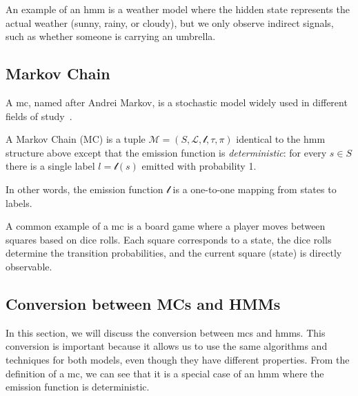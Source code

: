 An example of an \gls{hmm} is a weather model where the hidden state represents the actual weather (sunny, rainy, or cloudy), but we only observe indirect signals, such as whether someone is carrying an umbrella.

\subsection{Markov Chain}\label{subsec:mc}
A \gls{mc}, named after Andrei Markov, is a stochastic model widely used in different fields of study~\cite{Rabiner89}.
\begin{definition}
    A Markov Chain (MC) is a tuple $\mathcal{M} = (S, \mathcal{L}, \mathscr{l}, \tau,  \pi)$ identical to the \gls{hmm} structure above except that the emission function is
    \emph{deterministic}: for every $s\in S$ there is a single label
    $l=\mathscr{l}(s)$ emitted with probability 1.
\end{definition}
In other words, the emission function $\mathscr{l}$ is a one-to-one mapping from states to labels.

A common example of a \gls{mc} is a board game where a player moves between squares based on dice rolls.
Each square corresponds to a state, the dice rolls determine the transition probabilities, and the current square (state) is directly observable.

\subsection{Conversion between MCs and HMMs}\label{subsec:mc_hmm_conversion}
In this section, we will discuss the conversion between \glspl{mc} and \glspl{hmm}.
This conversion is important because it allows us to use the same algorithms and techniques for both models, even though they have different properties.
From the definition of a \gls{mc}, we can see that it is a special case of an \gls{hmm} where the emission function is deterministic.

